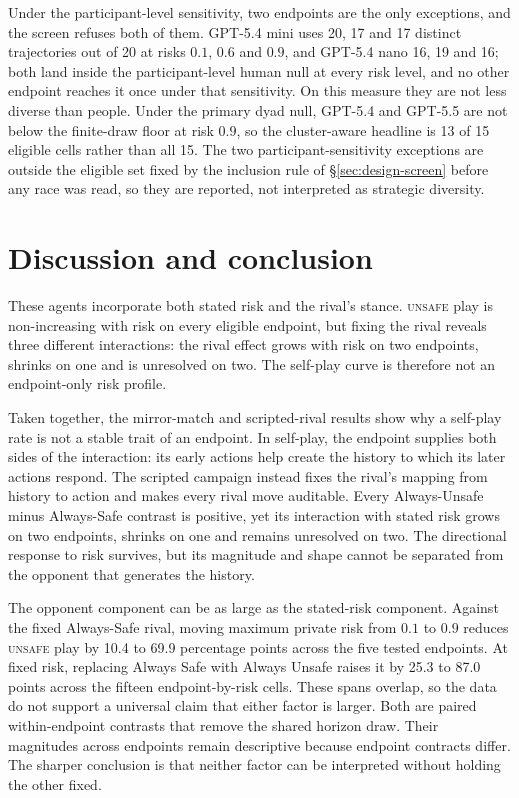 \documentclass[sigconf,anonymous]{aamas}
\newcommand{\Unsafe}{\textsc{unsafe}}
\begin{document}
Under the participant-level sensitivity, two endpoints are the only
exceptions, and the screen refuses both of them.
GPT-5.4 mini uses 20, 17 and 17 distinct trajectories out of 20 at
risks $0.1$, $0.6$ and $0.9$, and GPT-5.4 nano 16, 19 and 16; both land inside
the participant-level human null at every risk level, and no other endpoint reaches
it once under that sensitivity. On this measure they are not less diverse than
people. Under the primary dyad null, GPT-5.4 and GPT-5.5 are not below the
finite-draw floor at risk $0.9$, so the cluster-aware headline is 13 of 15 eligible cells
rather than all 15. The two participant-sensitivity exceptions are outside the
eligible set fixed by the inclusion rule of \S\ref{sec:design-screen} before
any race was read, so they are reported, not interpreted as strategic diversity.

\section{Discussion and conclusion}
\label{sec:discussion}

These agents incorporate both stated risk and the rival's stance. \Unsafe{} play
is non-increasing with risk on every eligible endpoint, but fixing the rival
reveals three different interactions: the rival effect grows with risk on two
endpoints, shrinks on one and is unresolved on two. The self-play curve is
therefore not an endpoint-only risk profile.

Taken together, the mirror-match and scripted-rival results show why a
self-play rate is not a stable trait of an endpoint. In self-play, the endpoint
supplies both sides of the interaction: its early actions help create the
history to which its later actions respond. The scripted campaign instead
fixes the rival's mapping from history to action and makes every rival move
auditable. Every Always-Unsafe minus Always-Safe contrast is positive, yet its
interaction with stated risk grows on two endpoints, shrinks on one and remains
unresolved on two. The directional response to risk survives, but its magnitude
and shape cannot be separated from the opponent that generates the history.

The opponent component can be as large as the stated-risk component. Against
the fixed Always-Safe rival, moving maximum private risk from $0.1$ to $0.9$
reduces \Unsafe{} play by 10.4 to 69.9 percentage points across the five tested
endpoints. At fixed risk, replacing Always Safe with Always Unsafe raises it by
25.3 to 87.0 points across the fifteen endpoint-by-risk cells. These spans
overlap, so the data do not support a universal claim that either factor is
larger. Both are paired within-endpoint contrasts that remove the shared
horizon draw. Their magnitudes across endpoints remain descriptive because
endpoint contracts differ. The sharper conclusion is that neither factor can
be interpreted without holding the other fixed.
\end{document}
